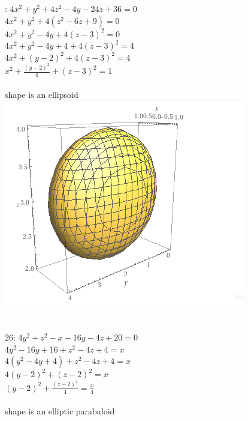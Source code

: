 \documentclass{article}
\begin{document}
: $4x^2 + y^2 +4z^2 -4y-24z+36 = 0$ \\
$4x^2 +y^2 +4(z^2-6z+9) = 0$ \\
$4x^2 + y^2 - 4y +4(z-3)^2 = 0$\\
$4x^2+y^2-4y+4 +4(z-3)^2 =4$ \\
$4x^2+(y-2)^2 +4(z-3)^2 =4$ \\
$x^2+\frac{(y-2)^2}{4} +(z-3)^2 =1$ \\ \\
shape is an ellipsoid
\\
\includegraphics{ellipsoid.png}
\\ \\ \\
26: $4y^2 + z^2 -x - 16y -4z + 20 = 0$\\
$4y^2 -16y +16 + z^2  -4z + 4 = x$\\
$4(y^2 -4y +4) + z^2  -4z + 4 = x$\\
$4(y-2)^2 + (z-2)^2 = x$\\
$(y-2)^2 + \frac{(z-2)^2}{4} = \frac{x}{4}$\\ \\
shape is an elliptic parabaloid
\end{document}
